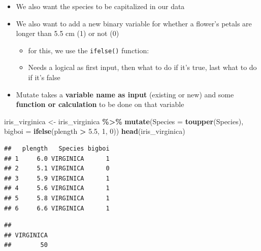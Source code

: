 \documentclass[
]{book}
\newenvironment{Shaded}{\begin{snugshade}}{\end{snugshade}}
\newcommand{\AttributeTok}[1]{\textcolor[rgb]{0.13,0.29,0.53}{#1}}
\newcommand{\DecValTok}[1]{\textcolor[rgb]{0.00,0.00,0.81}{#1}}
\newcommand{\FloatTok}[1]{\textcolor[rgb]{0.00,0.00,0.81}{#1}}
\newcommand{\FunctionTok}[1]{\textcolor[rgb]{0.13,0.29,0.53}{\textbf{#1}}}
\newcommand{\NormalTok}[1]{#1}
\newcommand{\OtherTok}[1]{\textcolor[rgb]{0.56,0.35,0.01}{#1}}
\newcommand{\SpecialCharTok}[1]{\textcolor[rgb]{0.81,0.36,0.00}{\textbf{#1}}}
\providecommand{\tightlist}{%
  \setlength{\itemsep}{0pt}\setlength{\parskip}{0pt}}
\begin{document}
\begin{itemize}
\tightlist
\item
  We also want the species to be capitalized in our data
\item
  We also want to add a new binary variable for whether a flower's petals are longer than 5.5 cm (1) or not (0)

  \begin{itemize}
  \tightlist
  \item
    for this, we use the \texttt{ifelse()} function:
  \item
    Needs a logical as first input, then what to do if it's true, last what to do if it's false
  \end{itemize}
\item
  Mutate takes a \textbf{variable name as input} (existing or new) and some \textbf{function or calculation} to be done on that variable
\end{itemize}

\begin{Shaded}
\begin{Highlighting}[]
\NormalTok{iris\_virginica }\OtherTok{\textless{}{-}}\NormalTok{ iris\_virginica }\SpecialCharTok{\%\textgreater{}\%} 
  \FunctionTok{mutate}\NormalTok{(}\AttributeTok{Species =} \FunctionTok{toupper}\NormalTok{(Species),}
         \AttributeTok{bigboi =} \FunctionTok{ifelse}\NormalTok{(plength }\SpecialCharTok{\textgreater{}} \FloatTok{5.5}\NormalTok{, }\DecValTok{1}\NormalTok{, }\DecValTok{0}\NormalTok{))}
\FunctionTok{head}\NormalTok{(iris\_virginica)}
\end{Highlighting}
\end{Shaded}

\begin{verbatim}
##   plength   Species bigboi
## 1     6.0 VIRGINICA      1
## 2     5.1 VIRGINICA      0
## 3     5.9 VIRGINICA      1
## 4     5.6 VIRGINICA      1
## 5     5.8 VIRGINICA      1
## 6     6.6 VIRGINICA      1
\end{verbatim}

\begin{Shaded}
\end{Shaded}

\begin{verbatim}
## 
## VIRGINICA 
##        50
\end{verbatim}
\end{document}
